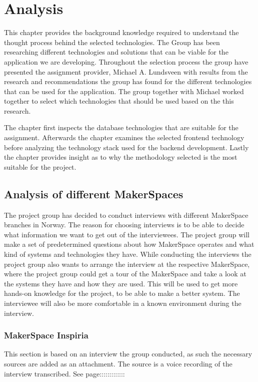 \chapter{Analysis}
This chapter provides the background knowledge required to understand the thought process behind the selected technologies.
The Group has been researching different technologies and solutions that can be viable for the application we are developing. Throughout the selection process the group have presented the assignment provider, Michael A. Lundsveen with results from the research and recommendations the group has found for the different technologies that can be used for the application. The group together with Michael worked together to select which technologies that should be used based on the this research.

The chapter first inspects the database technologies that are suitable for the assignment.
Afterwards the chapter examines the selected frontend technology before analyzing the technology stack used for the backend development.
Lastly the chapter provides insight as to why the methodology selected is the most suitable for the project.

\section{Analysis of different MakerSpaces}
The project group has decided to conduct interviews with different MakerSpace branches in Norway. The reason for choosing interviews is to be able to decide what information we want to get out of the interviewees. The project group will make a set of predetermined questions about how MakerSpace operates and what kind of systems and technologies they have. While conducting the interviews the project group also wants to arrange the interview at the respective MakerSpace, where the project group could get a tour of the MakerSpace and take a look at the systems they have and how they are used. This will be used to get more hands-on knowledge for the project, to be able to make a better system. The interviewee will also be more comfortable in a known environment during the interview.

\subsection{MakerSpace Inspiria}

This section is based on an interview the group conducted, as such the necessary sources are added as an attachment. The source is a voice recording of the interview transcribed. See page::::::::::::: %

